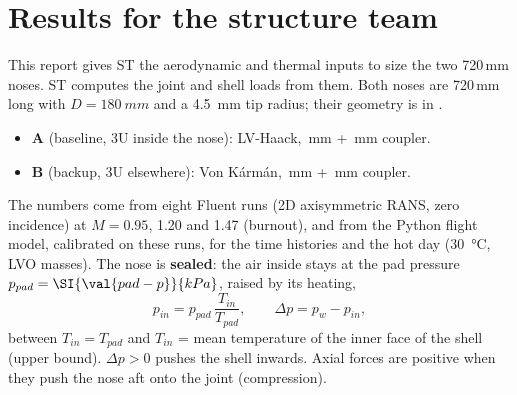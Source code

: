 \section{Results for the structure team}
\label{sec:results}

This report gives ST the aerodynamic and thermal inputs to size the two 720\,mm noses. ST computes
the joint and shell loads from them. Both noses are 720\,mm long with $D = \SI{180}{mm}$ and a
\SI{4.5}{mm} tip radius; their geometry is in .
\begin{itemize}
\item \textbf{A} (baseline, 3U inside the nose): LV-Haack, \,mm + \,mm coupler.
\item \textbf{B} (backup, 3U elsewhere): Von K\'arm\'an, \,mm + \,mm coupler.
\end{itemize}
The numbers come from eight Fluent runs (2D axisymmetric RANS, zero incidence) at $M = 0.95$, 1.20 and
1.47 (burnout), and from the Python flight model, calibrated on these runs, for the time histories and
the hot day (\SI{30}{\celsius}, LVO masses). The nose is \textbf{sealed}: the air inside stays at the
pad pressure $p_{pad} = \SI{\val{pad-p}}{kPa}$, raised by its heating,
\begin{equation}
p_{in} = p_{pad}\,\frac{T_{in}}{T_{pad}}, \qquad \Delta p = p_w - p_{in},
\label{eq:dp}
\end{equation}
between $T_{in} = T_{pad}$ and $T_{in}$ = mean temperature of the inner face of the shell (upper
bound). $\Delta p > 0$ pushes the shell inwards. Axial forces are positive when they push the nose
aft onto the joint (compression).

